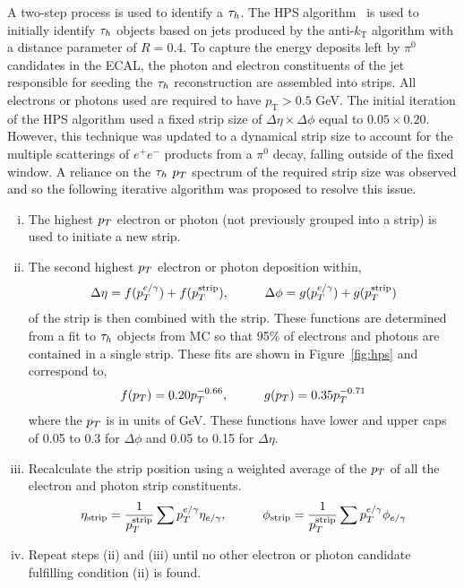 A two-step process is used to identify a $\tau_{h}$.
The \ac{HPS} algorithm~\cite{Sirunyan:2018pgf} is used to initially identify $\tau_{h}$ objects based on jets produced by the anti-$k_{\text{T}}$ algorithm with a distance parameter of $R = 0.4$. 
To capture the energy deposits left by $\pi^0$ candidates in the \ac{ECAL}, the photon and electron constituents of the jet responsible for seeding the $\tau_{h}$ reconstruction are assembled into strips. 
All electrons or photons used are required to have $p_{\text{T}} > 0.5$ GeV.
The initial iteration of the \ac{HPS} algorithm used a fixed strip size of $\Delta \eta \times \Delta \phi$ equal to $0.05 \times 0.20$.
However, this technique was updated to a dynamical strip size to account for the multiple scatterings of $e^+ e^-$ products from a $\pi^0$ decay, falling outside of the fixed window.
A reliance on the $\tau_{h}$ $p_{T}$ spectrum of the required strip size was observed and so the following iterative algorithm was proposed to resolve this issue.

\begin{enumerate}[i)]
\item The highest $p_{T}$ electron or photon (not previously grouped into a strip) is used to initiate a new strip.
\item The second highest $p_{T}$ electron or photon deposition within,
\begin{equation}
  \Delta \eta = f(p_{T}^{e/\gamma}) + f(p_{T}^{\text{strip}}), \hspace{1cm} \Delta \phi = g(p_{T}^{e/\gamma}) + g(p_{T}^{\text{strip}})
\end{equation}
of the strip is then combined with the strip.
These functions are determined from a fit to $\tau_{h}$ objects from \ac{MC} so that 95\% of electrons and photons are contained in a single strip.
These fits are shown in Figure~\ref{fig:hps} and correspond to,
\begin{equation}
f(p_{T}) = 0.20 p_{T}^{-0.66}, \hspace{1cm} g(p_{T}) = 0.35 p_{T}^{-0.71}
\end{equation}
where the $p_{T}$ is in units of GeV.
These functions have lower and upper caps of 0.05 to 0.3 for $\Delta\phi$ and 0.05 to 0.15 for $\Delta\eta$.
\item Recalculate the strip position using a weighted average of the $p_{T}$ of all the electron and photon strip constituents.
\begin{equation}
\eta_{\text{strip}} = \frac{1}{p_{T}^{\text{strip}}} \sum p_{T}^{e/\gamma} \eta_{e/\gamma}, \hspace{1cm} \phi_{\text{strip}} = \frac{1}{p_{T}^{\text{strip}}} \sum p_{T}^{e/\gamma} \phi_{e/\gamma}
\end{equation}
\item Repeat steps (ii) and (iii) until no other electron or photon candidate fulfilling condition (ii) is found.
\end{enumerate}

